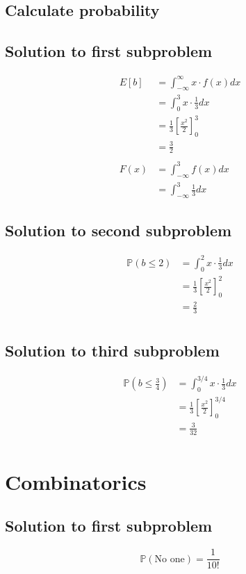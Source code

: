 \documentclass[12pt]{article}
\newcommand{\bbP}{\mathbb{P}}
\renewcommand{\_}[1]{\underline{ #1 }}
\theoremstyle{definition}
\numberwithin{equation}{subsection}
\begin{document}
\subsection{Calculate probability}
\subsection*{Solution to first subproblem}
\begin{align*}
E[b]&=\int_{-\infty}^{\infty}x\cdot f(x)dx \\
&=\int_{0}^{3}x\cdot \frac{1}{3}dx \\
&=\frac{1}{3} \left[ \frac{x^2}{2} \right]_{0}^{3} \\
&=\frac{3}{2} \\ \\
F(x)&=\int_{-\infty}^{3}f(x)dx \\
&=\int_{-\infty}^{3}\frac{1}{3}dx
\end{align*}

\subsection*{Solution to second subproblem}
\begin{align*}
\bbP(b\leq 2)&=\int_{0}^{2}x\cdot \frac{1}{3}dx \\
&=\frac{1}{3} \left[ \frac{x^2}{2} \right]_{0}^{2} \\
&=\frac{2}{3} \\
\end{align*}

\subsection*{Solution to third subproblem}
\begin{align*}
\bbP \left( b \leq \frac{3}{4} \right)&=\int_{0}^{3/4}x\cdot \frac{1}{3}dx \\
&=\frac{1}{3} \left[ \frac{x^2}{2} \right]_{0}^{3/4} \\
&=\frac{3}{32} \\
\end{align*}

\section{Combinatorics}
\subsection*{Solution to first subproblem}
\[
\bbP(\text{No one})=\frac{1}{10!}
\]
\end{document}
